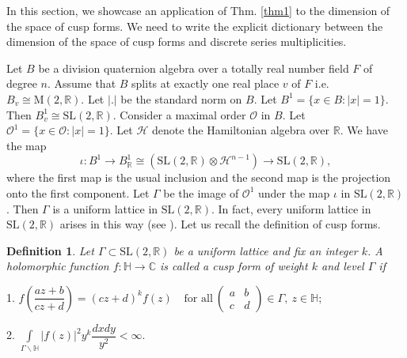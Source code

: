 \documentclass[11 pt]{amsart}
\newcommand{\R}{{\mathbb R}}
\newcommand{\C}{{\mathbb C}}
\theoremstyle{definition}
\newtheorem{definition}[theorem]{Definition}
\numberwithin{equation}{section}
\begin{document}
In this section, we showcase an application of Thm. \ref{thm1} to the dimension of the space of cusp forms. We need to write the explicit dictionary between the dimension of the space of cusp forms and discrete series multiplicities. 

Let $B$ be a division quaternion algebra over a totally real number field $F$ of degree $n$. Assume that $B$ splits at exactly one real place $v$ of $F$ i.e. $B_v \cong \mathrm{M}(2, \R)$. Let $|.|$ be the standard norm on $B$. Let $B^1 = \{ x \in B :  |x|=1 \}$. Then $B^1_v \cong \mathrm{SL}(2, \R)$. Consider a maximal order $\mathcal{O}$ in $B$. Let $\mathcal{O}^1 = \{ x \in \mathcal{O} : |x| =1 \}$.  Let $\mathcal{H}$ denote the Hamiltonian algebra over $\R$. We have the map 
$$ \iota : B^1 \longrightarrow B_{\R}^1 \cong (\mathrm{SL}(2, \R) \otimes \mathcal{H}^{n-1}) \longrightarrow \mathrm{SL}(2, \R),$$
where the first map is the usual inclusion and the second map is the projection onto the first component. 
Let $\Gamma$ be the image of $\mathcal{O}^1$ under the map $\iota$ in $\mathrm{SL}(2, \R)$. Then $\Gamma$ is a uniform lattice in $\mathrm{SL}(2, \R)$. In fact, every uniform lattice in $\mathrm{SL}(2, \R)$ arises in this way (see \cite{AW}). Let us recall the definition of cusp forms. 

\begin{definition}
\textit{Let $\Gamma \subset \mathrm{SL}(2, \R)$ be a uniform lattice and fix an integer $k$. A holomorphic function $f : \mathbb{H} \longrightarrow \C$ is called a cusp form of weight $k$ and level $\Gamma$ if} 

1. \textit{$f\left(\dfrac{az+b}{cz+d}\right)=(cz+d)^k f(z) \hspace{10pt}\ \text{for all}\  \begin{pmatrix}
a & b\\
c & d
\end{pmatrix} \in \Gamma,~ z \in \mathbb{H}$};

2. \textit{$\int\limits_{\Gamma \backslash \mathbb{H}} | f(z) |^2 y^k \dfrac{dx dy}{y^2} < \infty.$}
\end{definition}
\end{document}
